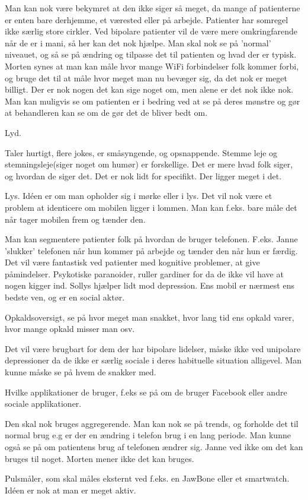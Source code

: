 \begin{description}[style=nextline]
    Man kan nok være bekymret at den ikke siger så meget, da mange af patienterne er enten bare derhjemme, et værested eller på arbejde. Patienter har somregel ikke særlig store cirkler. Ved bipolare patienter vil de være mere omkringfarende når de er i mani, så her kan det nok hjælpe. Man skal nok se på 'normal' niveauet, og så se på ændring og tilpasse det til patienten og hvad der er typisk. Morten synes at man kan måle hvor mange WiFi forbindelser folk kommer forbi, og bruge det til at måle hvor meget man nu bevæger sig, da det nok er meget billigt. Der er nok nogen det kan sige noget om, men alene er det nok ikke nok. Man kan muligvis se om patienten er i bedring ved at se på deres mønstre og gør at behandleren kan se om de gør det de bliver bedt om.
\item[Idé 4] 
    Lyd.
    
    Taler hurtigt, flere jokes, er småsyngende, og opsnappende. Stemme leje og stemningsleje(siger noget om humør) er forskellige. Det er mere hvad folk siger, og hvordan de siger det. Det er nok lidt for specifikt. Der ligger meget i det.
\item[Idé 5]
    Lys. Idéen er om man opholder sig i mørke eller i lys. Det vil nok være et problem at identicere om mobilen ligger i lommen. Man kan f.eks. bare måle det når tager mobilen frem og tænder den. 
    
    Man kan segmentere patienter folk på hvordan de bruger telefonen. F.eks. Janne 'slukker' telefonen når hun kommer på arbejde og tænder den når hun er færdig. Det vil være fantastisk ved patienter med kognitive problemer, at give påmindelser. Psykotiske paranoider, ruller gardiner for da de ikke vil have at nogen kigger ind. Sollys hjælper lidt mod depression. Ens mobil er nærmest ens bedste ven, og er en social aktør. 
\item[Idé 6]
    Opkaldsoversigt, se på hvor meget man snakket, hvor lang tid ens opkald varer, hvor mange opkald misser man osv.
    
    Det vil være brugbart for dem der har bipolare lidelser, måske ikke ved unipolare depressioner da de ikke er særlig sociale i deres habituelle situation alligevel. Man kunne måske se på hvem de snakker med.
\item[Idé 7] 
    Hvilke applikationer de bruger, f.eks se på om de bruger Facebook eller andre sociale applikationer. 
    
    Den skal nok bruges aggregerende. Man kan nok se på trends, og forholde det til normal brug e.g er der en ændring i telefon brug i en lang periode. Man kunne også se på om patientens brug af telefonen ændrer sig. Janne ved ikke om det kan bruges til noget. Morten mener ikke det kan bruges.
\item[Idé 8]
    Pulsmåler, som skal måles eksternt ved f.eks. en JawBone eller et smartwatch. Idéen er nok at man er meget aktiv.
    

\end{description}
